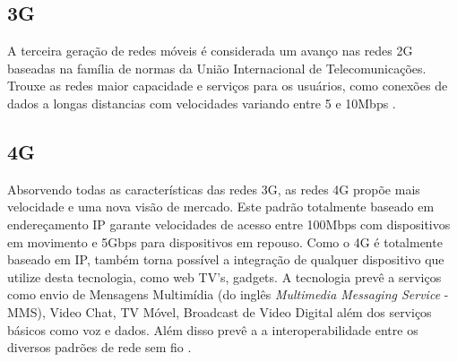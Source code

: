 \subsection{3G}
A terceira geração de redes móveis é considerada um avanço nas redes 2G baseadas na família de normas da União Internacional de Telecomunicações. Trouxe as redes maior capacidade e serviços para os usuários, como conexões de dados a longas distancias com velocidades variando entre 5 e 10Mbps \cite{GeracoesTelefoniaMovel}.

\subsection{4G}
Absorvendo todas as características das redes 3G, as redes 4G propõe mais velocidade e uma nova visão de mercado. Este padrão totalmente baseado em endereçamento IP garante velocidades de acesso entre 100Mbps com dispositivos em movimento e 5Gbps para dispositivos em repouso. Como o 4G é totalmente baseado em IP, também torna possível a integração de qualquer dispositivo que utilize desta tecnologia, como web TV's, gadgets. A tecnologia prevê a serviços como envio de Mensagens Multimídia (do inglês \emph{Multimedia Messaging Service} - MMS), Video Chat, TV Móvel, Broadcast de Video Digital além dos serviços básicos como voz e dados. Além disso prevê a a interoperabilidade entre os diversos padrões de rede sem fio \cite{GeracoesTelefoniaMovel}.

